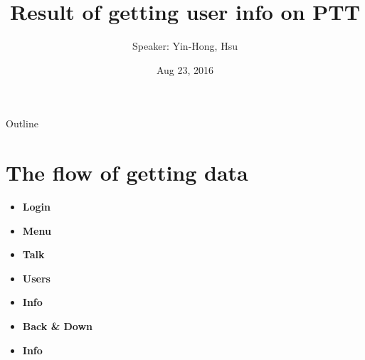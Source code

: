 \documentclass{beamer}
\title {
    Result of getting user info on PTT
}
\author {
    Speaker: Yin-Hong, Hsu
}
\date {
    Aug 23, 2016 %
}
\begin{document}
\begin{frame}
    \titlepage
\end{frame}

\begin{frame}{Outline}
    \tableofcontentsgather
    \tableofcontents
\end{frame}


\section{The flow of getting data}

\begin{frame}
    \begin{itemize}
        \item \textbf{Login}
        \item \textbf{Menu} 
        \item \textbf{Talk}
        \item \textbf{Users}
        \item \textbf{Info}
        \item \textbf{Back \& Down}
        \item \textbf{Info}
    \end{itemize}
\end{frame}
\end{document}
